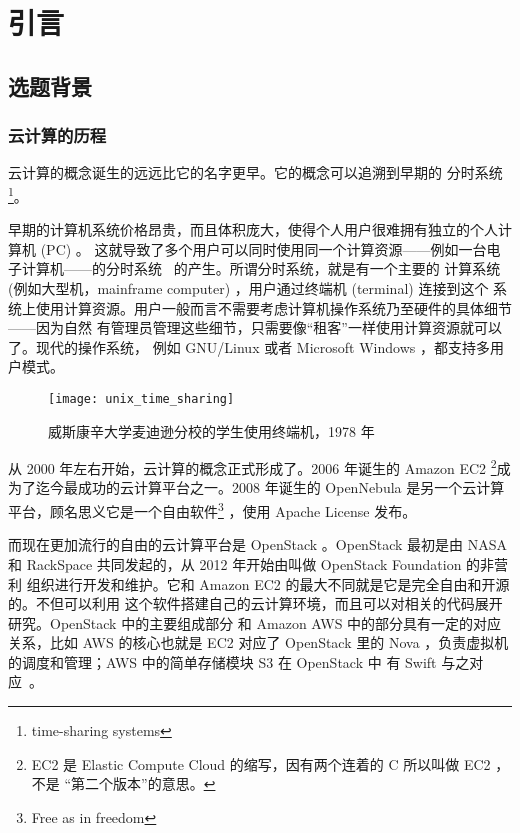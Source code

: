 \chapter{引言}
\label{cha:intro}

\section{选题背景}

\subsection{云计算的历程}

云计算的概念诞生的远远比它的名字更早。它的概念可以追溯到早期的
分时系统\footnote{time-sharing systems}。

早期的计算机系统价格昂贵，而且体积庞大，使得个人用户很难拥有独立的个人计算机 (PC) 。
这就导致了多个用户可以同时使用同一个计算资源——例如一台电子计算机——的分时系统
~\cite{timesharing}的产生。所谓分时系统，就是有一个主要的
计算系统 (例如大型机，mainframe computer) ，用户通过终端机 (terminal) 连接到这个
系统上使用计算资源。用户一般而言不需要考虑计算机操作系统乃至硬件的具体细节——因为自然
有管理员管理这些细节，只需要像“租客”一样使用计算资源就可以了。现代的操作系统，
例如 GNU/Linux 或者 Microsoft Windows ，都支持多用户模式。

\begin{figure}[h]
    \centering
    \texttt{[image: unix\_time\_sharing]}
    \caption{威斯康辛大学麦迪逊分校的学生使用终端机，1978 年}
\end{figure}

从 2000 年左右开始，云计算的概念正式形成了。2006 年诞生的 Amazon EC2 \footnote{EC2
  是 Elastic Compute Cloud 的缩写，因有两个连着的 C 所以叫做 EC2 ，不是
  “第二个版本”的意思。}成为了迄今最成功的云计算平台之一。2008 年诞生的 OpenNebula
是另一个云计算平台，顾名思义它是一个自由软件\footnote{Free as in freedom}
，使用 Apache License 发布。

而现在更加流行的自由的云计算平台是 OpenStack 。OpenStack 最初是由
 NASA 和 RackSpace 共同发起的，从 2012 年开始由叫做 OpenStack Foundation 的非营利
组织进行开发和维护。它和 Amazon EC2 的最大不同就是它是完全自由和开源的。不但可以利用
这个软件搭建自己的云计算环境，而且可以对相关的代码展开研究。OpenStack 中的主要组成部分
和 Amazon AWS 中的部分具有一定的对应关系，比如 AWS 的核心也就是 EC2 对应了 OpenStack
 里的 Nova ，负责虚拟机的调度和管理；AWS 中的简单存储模块 S3 在 OpenStack 中
有 Swift 与之对应~\cite{openstack}。

